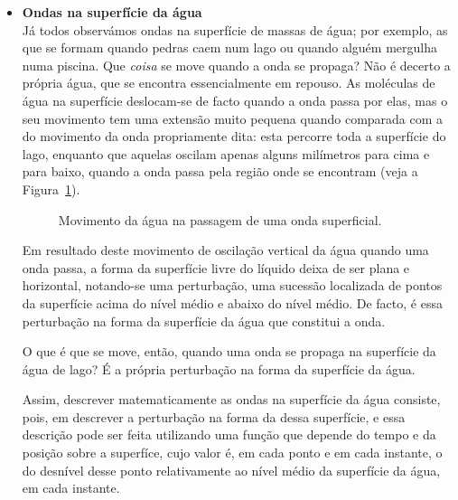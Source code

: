 \begin{itemize}
\item \textbf{Ondas na superfície da água}\\
    Já todos observámos ondas na superfície de massas de água; por exemplo, as
    que se formam quando pedras caem num lago ou quando alguém mergulha numa
    piscina. Que \emph{coisa} se move quando a onda se propaga? Não é decerto a
    própria água, que se encontra essencialmente em repouso. As moléculas de
    água na superfície deslocam-se de facto quando a onda passa por elas, mas o
    seu movimento tem uma extensão muito pequena quando comparada com a do
    movimento da onda propriamente dita: esta percorre toda a superfície do
    lago, enquanto que aquelas oscilam apenas alguns milímetros para cima e para
    baixo, quando a onda passa pela região onde se encontram (veja a
    Figura~\ref{fig:oo010}).
    \begin{figure}[htb]
        {\centering
            
            \caption{Movimento da água na passagem de uma onda
                superficial.\label{fig:oo010}}

        }
    \end{figure}
    Em resultado deste movimento de oscilação vertical da água quando uma onda
    passa, a forma da superfície livre do líquido deixa de ser plana e
    horizontal, notando-se uma perturbação, uma sucessão localizada de pontos da
    superfície acima do nível médio e abaixo do nível médio. De facto, é essa
    perturbação na forma da superfície da água que constitui a onda.

    O que é que se move, então, quando uma onda se propaga na superfície da água
    de lago? É a própria perturbação na forma da superfície da água. 

    Assim, descrever matematicamente as ondas na superfície da água consiste,
    pois, em descrever a perturbação na forma da dessa superfície, e essa
    descrição pode ser feita utilizando uma função que depende do tempo e da
    posição sobre a superfíce, cujo valor é, em cada ponto e em cada instante, o
    do desnível desse ponto relativamente ao nível médio da superfície da água,
    em cada instante.


\end{itemize}
